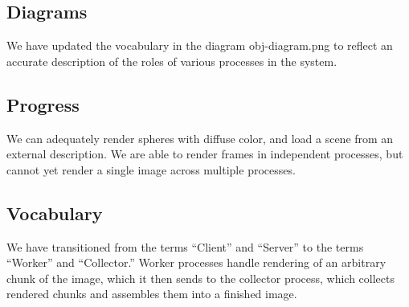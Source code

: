 \subsection{Diagrams}

We have updated the vocabulary in the diagram obj-diagram.png to reflect 
an accurate description of the roles of various processes in the system.

\subsection{Progress}

We can adequately render spheres with diffuse color, and load a scene from
an external description. We are able to render frames in independent processes,
but cannot yet render a single image across multiple processes. 

\subsection{Vocabulary}

We have transitioned from the terms ``Client'' and ``Server'' to the terms
``Worker'' and ``Collector.'' Worker processes handle rendering of an arbitrary
chunk of the image, which it then sends to the collector process, which collects
rendered chunks and assembles them into a finished image.
